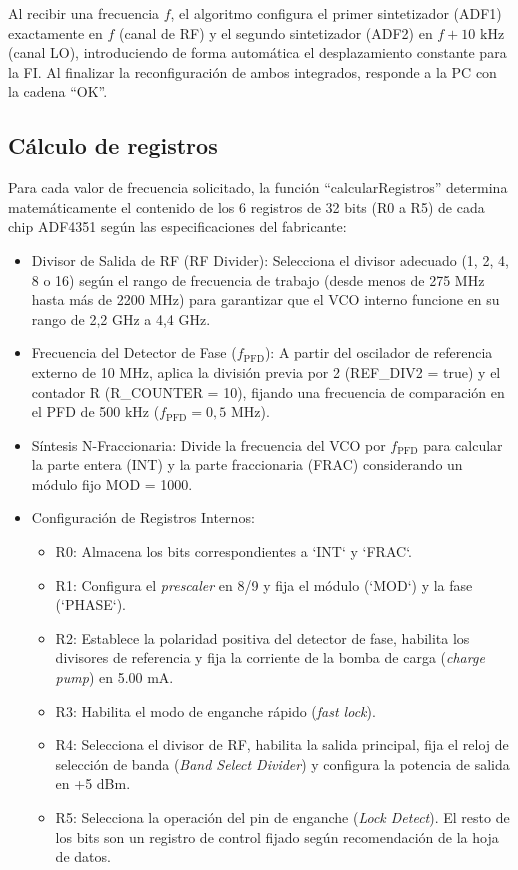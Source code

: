 Al recibir una frecuencia $f$, el algoritmo configura el primer sintetizador (ADF1) exactamente en $f$ (canal de RF) y el segundo sintetizador (ADF2) en $f + 10\text{ kHz}$ (canal LO), introduciendo de forma automática el desplazamiento constante para la FI. Al finalizar la reconfiguración de ambos integrados, responde a la PC con la cadena ``OK''.

\subsection{Cálculo de registros}
Para cada valor de frecuencia solicitado, la función ``calcularRegistros'' determina matemáticamente el contenido de los 6 registros de 32 bits (R0 a R5) de cada chip ADF4351 según las especificaciones del fabricante:

\begin{itemize}
    \item Divisor de Salida de RF (RF Divider): Selecciona el divisor adecuado (1, 2, 4, 8 o 16) según el rango de frecuencia de trabajo (desde menos de 275 MHz hasta más de 2200 MHz) para garantizar que el VCO interno funcione en su rango de 2,2 GHz a 4,4 GHz.
    \item Frecuencia del Detector de Fase ($f_{\text{PFD}}$): A partir del oscilador de referencia externo de 10 MHz, aplica la división previa por 2 (REF\_DIV2 = true) y el contador R (R\_COUNTER = 10), fijando una frecuencia de comparación en el PFD de 500 kHz ($f_{\text{PFD}} = 0,5\text{ MHz}$).
    \item Síntesis N-Fraccionaria: Divide la frecuencia del VCO por $f_{\text{PFD}}$ para calcular la parte entera (INT) y la parte fraccionaria (FRAC) considerando un módulo fijo MOD = 1000.
    \item Configuración de Registros Internos:
    \begin{itemize}
        \item R0: Almacena los bits correspondientes a `INT` y `FRAC`.
        \item R1: Configura el \textit{prescaler} en 8/9 y fija el módulo (`MOD`) y la fase (`PHASE`).
        \item R2: Establece la polaridad positiva del detector de fase, habilita los divisores de referencia y fija la corriente de la bomba de carga (\textit{charge pump}) en 5.00 mA.
        \item R3: Habilita el modo de enganche rápido (\textit{fast lock}).
        \item R4: Selecciona el divisor de RF, habilita la salida principal, fija el reloj de selección de banda (\textit{Band Select Divider}) y configura la potencia de salida en +5 dBm.
        \item R5: Selecciona la operación del pin de enganche (\textit{Lock Detect}). El resto de los bits son un registro de control fijado según recomendación de la hoja de datos.
    \end{itemize}
\end{itemize}

